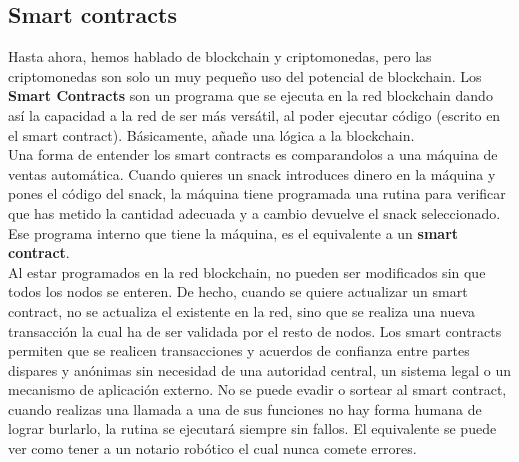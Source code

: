 \subsection{Smart contracts}

Hasta ahora, hemos hablado de blockchain y criptomonedas, pero las criptomonedas son solo un muy pequeño uso del potencial de blockchain. Los \textbf{Smart Contracts}\cite{etherSmartContract} son un programa que se ejecuta en la red blockchain dando así la capacidad a la red de ser más versátil, al poder ejecutar código (escrito en el smart contract). Básicamente, añade una lógica a la blockchain. \\

Una forma de entender los smart contracts es comparandolos a una máquina de ventas automática. Cuando quieres un snack introduces dinero en la máquina y pones el código del snack, la máquina tiene programada una rutina para verificar que has metido la cantidad adecuada y a cambio devuelve el snack seleccionado. Ese programa interno que tiene la máquina, es el equivalente a un \textbf{smart contract}. \\


Al estar programados en la red blockchain, no pueden ser modificados sin que todos los nodos se enteren. De hecho, cuando se quiere actualizar un smart contract, no se actualiza el existente en la red, sino que se realiza una nueva transacción la cual ha de ser validada por el resto de nodos. Los smart contracts permiten que se realicen transacciones y acuerdos de confianza entre partes dispares y anónimas sin necesidad de una autoridad central, un sistema legal o un mecanismo de aplicación externo. No se puede evadir o sortear al smart contract, cuando realizas una llamada a una de sus funciones no hay forma humana de lograr burlarlo, la rutina se ejecutará siempre sin fallos. El equivalente se puede ver como tener a un notario robótico el cual nunca comete errores.  \\

\label{sec:smartContract}

